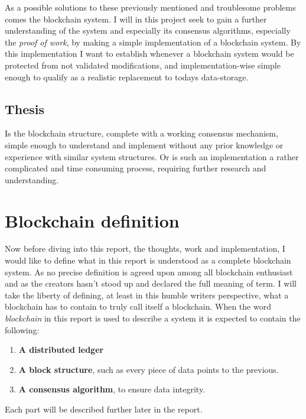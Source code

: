 \documentclass[paper=a4, fontsize=11pt]{scrartcl} %
\numberwithin{equation}{section} %
\numberwithin{figure}{section} %
\numberwithin{table}{section} %
\begin{document}
As a possible solutions to these previously mentioned and troublesome problems comes the blockchain system. I will in this project seek to gain a further understanding of the system and especially its consensus algorithms, especially the \textit{proof of work}, by making a simple implementation of a blockchain system. By this implementation I want to establish whenever a blockchain system would be protected from not validated modifications, and implementation-wise simple enough to qualify as a realistic replacement to todays data-storage. 

\subsection{Thesis}

Is the blockchain structure, complete with a working consensus mechanism, simple enough to understand and implement without any prior knowledge or experience with similar system structures. Or is such an implementation a rather complicated and time consuming process, requiring further research and understanding.

\section{Blockchain definition}
\label{sec:bcdef}

Now before diving into this report, the thoughts, work and implementation, I would like to define what in this report is understood as a complete blockchain system. As no precise definition is agreed upon among all blockchain enthusiast and as the creators hasn't stood up and declared the full meaning of term\cite{blockchainDef}. I will take the liberty of defining, at least in this humble writers perspective, what a blockchain has to contain to truly call itself a blockchain. When the word \textit{blockchain} in this report is used to describe a system it is expected to contain the following: 

\begin{enumerate}
\item \textbf{A distributed ledger}
\item \textbf{A block structure}, such as every piece of data points to the previous. 
\item \textbf{A consensus algorithm}, to ensure data integrity.
\end{enumerate}

Each part will be described further later in the  report.
\end{document}
